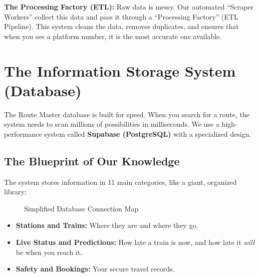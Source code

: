 \documentclass[12pt,a4paper]{report}
\begin{document}
\textbf{The Processing Factory (ETL):} Raw data is messy. Our automated ``Scraper Workers'' collect this data and pass it through a ``Processing Factory'' (ETL Pipeline). This system cleans the data, removes duplicates, and ensures that when you see a platform number, it is the most accurate one available.

\section{The Information Storage System (Database)}

The Route Master database is built for speed. When you search for a route, the system needs to scan millions of possibilities in milliseconds. We use a high-performance system called \textbf{Supabase (PostgreSQL)} with a specialized design.

\subsection*{The Blueprint of Our Knowledge}

The system stores information in 11 main categories, like a giant, organized library:

\begin{figure}[h!]
\centering
{}
\caption{Simplified Database Connection Map}
\end{figure}

\begin{itemize}[leftmargin=1.5em]
  \item \textbf{Stations and Trains:} Where they are and where they go.
  \item \textbf{Live Status and Predictions:} How late a train is now, and how late it \textit{will} be when you reach it.
  \item \textbf{Safety and Bookings:} Your secure travel records.
\end{itemize}
\end{document}
